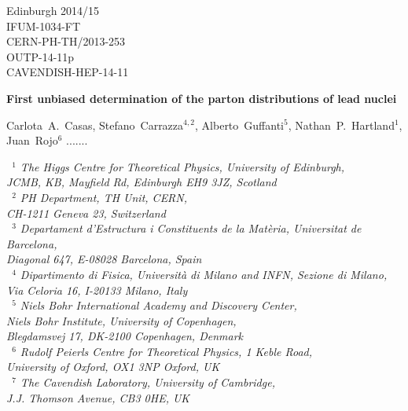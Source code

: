 \documentclass[11pt,a4paper]{article}
\begin{document}
\begin{figure}[h]
\end{figure}
\vspace{-2.0cm}
\begin{flushright}
Edinburgh 2014/15\\
IFUM-1034-FT\\
CERN-PH-TH/2013-253\\
OUTP-14-11p \\
CAVENDISH-HEP-14-11\\
\end{flushright}

\begin{center}
  {\Large \bf First unbiased determination of the parton distributions of lead nuclei}
\vspace{.7cm}


Carlota~A.~Casas, Stefano~Carrazza$^{4,2}$, Alberto~Guffanti$^{5}$, 
Nathan~P.~Hartland$^1$, Juan~Rojo$^{6}$ .......

\vspace{.3cm}
{\it ~$^1$ The Higgs Centre for Theoretical Physics, University of Edinburgh,\\
JCMB, KB, Mayfield Rd, Edinburgh EH9 3JZ, Scotland\\
~$^2$  PH Department, TH Unit, CERN,\\ CH-1211 Geneva 23, Switzerland\\
~$^3$ Departament d'Estructura i Constituents de la Mat\`eria, 
Universitat de Barcelona,\\ Diagonal 647, E-08028 Barcelona, Spain\\
~$^4$ Dipartimento di Fisica, Universit\`a di Milano and
INFN, Sezione di Milano,\\ Via Celoria 16, I-20133 Milano, Italy\\
~$^5$ Niels Bohr International Academy and Discovery Center, \\
Niels Bohr Institute,  University of Copenhagen, \\
Blegdamsvej 17, DK-2100 Copenhagen, Denmark\\
~$^6$ Rudolf Peierls Centre for Theoretical Physics, 1 Keble Road,\\ University of Oxford, OX1 3NP Oxford, UK\\
~$^7$ The Cavendish Laboratory, University of Cambridge,\\
J.J. Thomson Avenue, CB3 0HE, UK}
\end{center}   
\end{document}
